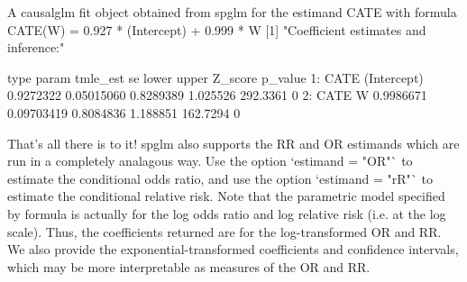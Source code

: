 \documentclass{article}
\begin{document}
\begin{Schunk}
\begin{Soutput}
A causalglm fit object obtained from spglm for the estimand CATE with formula 
CATE(W) = 0.927 * (Intercept) + 0.999 * W
[1] "Coefficient estimates and inference:"

   type       param  tmle_est         se     lower    upper  Z_score p_value
1: CATE (Intercept) 0.9272322 0.05015060 0.8289389 1.025526 292.3361       0
2: CATE           W 0.9986671 0.09703419 0.8084836 1.188851 162.7294       0
\end{Soutput}
\end{Schunk}



That's all there is to it! spglm also supports the RR and OR estimands which are run in a completely analagous way. Use the option `estimand = "OR"` to estimate the conditional odds ratio, and use the option `estimand = "rR"` to estimate the conditional relative risk. Note that the parametric model specified by formula is actually for the log odds ratio and log relative risk (i.e. at the log scale). Thus, the coefficients returned are for the log-transformed OR and RR. We also provide the exponential-transformed coefficients and confidence intervals, which may be more interpretable as measures of the OR and RR.
\end{document}
